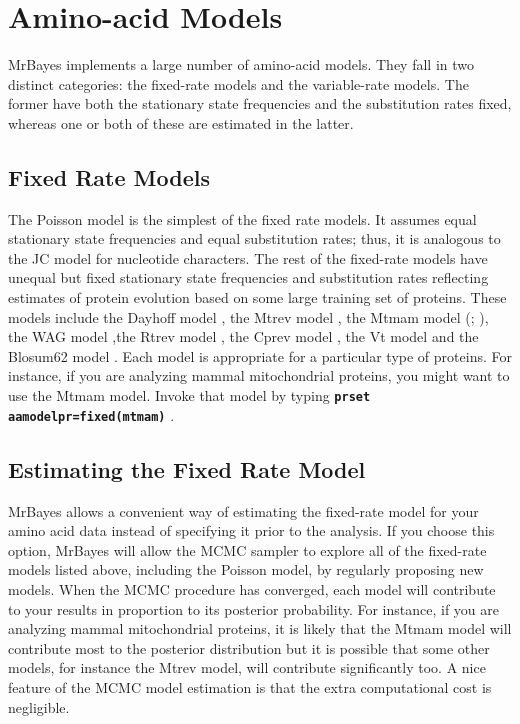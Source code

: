 \documentclass[12pt]{book}
\newcommand{\tb}[1]{\texttt{\textbf{#1}} }
\begin{document}
\section{Amino-acid Models}
\label{amino-acidModels}

MrBayes implements a large number of amino-acid models. They fall in two distinct
categories: the fixed-rate models and the variable-rate models. The former have both the
stationary state frequencies and the substitution rates fixed, whereas one or both of these
are estimated in the latter.

\subsection{Fixed Rate Models}
The Poisson model \citep{bishop87} is the simplest of the fixed rate models. It
assumes equal stationary state frequencies and equal substitution rates; thus, it is
analogous to the JC model for nucleotide characters. The rest of the fixed-rate models
have unequal but fixed stationary state frequencies and substitution rates reflecting
estimates of protein evolution based on some large training set of proteins. These models
include the Dayhoff model \citep{dayhoff78}, the Mtrev model
\citep{adachi96}, the Mtmam model (\citet{cao98}; \citet{yang98}), the WAG model
\citep{whelan01},the Rtrev model \citep{dimmic02}, the Cprev model \citep{adachi00},
 the Vt model \citep{muller00} and the Blosum62 model \citep{henikoff92}. Each model is
appropriate for a particular type of proteins. For instance, if you are analyzing mammal
mitochondrial proteins, you might want to use the Mtmam model. Invoke that model by
typing \tb{prset aamodelpr=fixed(mtmam)}.

\subsection{Estimating the Fixed Rate Model}
MrBayes allows a convenient way of estimating the fixed-rate model for your amino acid
data instead of specifying it prior to the analysis. If you choose this option, MrBayes will
allow the MCMC sampler to explore all of the fixed-rate models listed above, including
the Poisson model, by regularly proposing new models. When the MCMC procedure has
converged, each model will contribute to your results in proportion to its posterior
probability. For instance, if you are analyzing mammal mitochondrial proteins, it is likely
that the Mtmam model will contribute most to the posterior distribution but it is possible
that some other models, for instance the Mtrev model, will contribute significantly too. A
nice feature of the MCMC model estimation is that the extra computational cost is
negligible.
\end{document}
